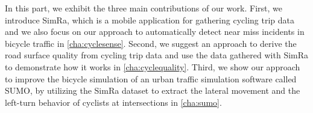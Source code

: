 \vspace*{\fill}

In this part, we exhibit the three main contributions of our work.
First, we introduce SimRa, which is a mobile application for gathering cycling trip data and we also focus on our approach to automatically detect near miss incidents in bicycle traffic in \cref{cha:cyclesense}.
Second, we suggest an approach to derive the road surface quality from cycling trip data and use the data gathered with SimRa to demonstrate how it works in \cref{cha:cyclequality}.
Third, we show our approach to improve the bicycle simulation of an urban traffic simulation software called SUMO, by utilizing the SimRa dataset to extract the lateral movement and the left-turn behavior of cyclists at intersections in \cref{cha:sumo}.
\vspace*{\fill}
